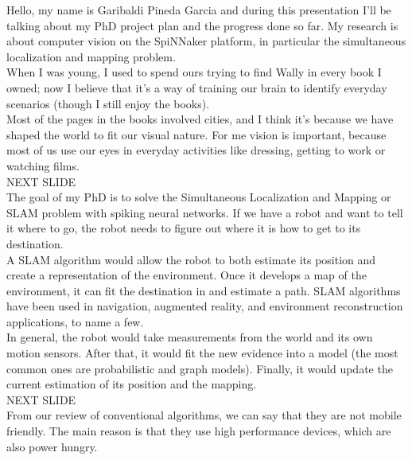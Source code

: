 \documentclass[12t,a4paper]{memoir}
\begin{document}
Hello, my name is Garibaldi Pineda Garcia and during this presentation I'll be 
talking about my PhD project plan and the progress done so far. My research is about computer vision on the SpiNNaker platform, in particular the simultaneous localization and mapping problem. \\

When I was young, I used to spend ours trying to find Wally in every book I owned; now I believe that it's a way of training our brain to identify everyday scenarios (though I still enjoy the books).\\

Most of the pages in the books involved cities, and I think it's because we have shaped the world to fit our visual nature. For me vision is important, because most of us use our eyes in everyday activities like dressing, getting to work or watching films.\\

{\Large NEXT SLIDE}\\

The goal of my PhD is to solve the Simultaneous Localization and Mapping or SLAM problem with spiking neural networks. If we have a robot and want to tell it where to go, the robot needs to figure out where it is how to get to its destination.\\

A SLAM algorithm would allow the robot to both estimate its position and create a representation of the environment. Once it develops a map of the environment, it can fit the destination in and estimate a path. SLAM algorithms have been used in navigation, augmented reality, and environment reconstruction applications, to name a few.\\

In general, the robot would take measurements from the world and its own motion sensors. After that, it would fit the new evidence into a model (the most common ones are probabilistic and graph models). Finally, it would update the current estimation of its position and the mapping.\\

{\Large NEXT SLIDE}\\

From our review of conventional algorithms, we can say that they are not mobile friendly. The main reason is that they use high performance devices, which are also power hungry.\\
\end{document}
